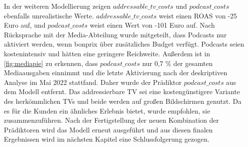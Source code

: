 In der weiteren Modellierung zeigen \(addressable\_tv\_costs\) und \(podcast\_costs\) ebenfalls unrealistische Werte. \(addressable\_tv\_costs\) weist einen \ac{ROAS} von -25 Euro auf, und \(podcast\_costs\) weist einen Wert von -101 Euro auf. Nach Rücksprache mit der Media-Abteilung wurde mitgeteilt, dass Podcasts nur aktiviert werden, wenn bonprix über zusätzliches Budget verfügt. Podcasts seien kostenintensiv und hätten eine geringere Reichweite. Außerdem ist in \autoref{fig:mediapie} zu erkennen, dass \(podcast\_costs\) nur 0,7 \% der gesamten Mediaausgaben einnimmt und die letzte Aktivierung nach der deskriptiven Analyse im Mai 2022 stattfand. Daher wurde der Prädiktor \(podcast\_costs\) aus dem Modell entfernt. Das addressierbare TV sei eine kostengünstigere Variante des herkömmlichen TVs und beide werden auf großen Bildschirmen genutzt. Da es für die Kunden ein ähnliches Erlebnis bietet, wurde empfohlen, sie zusammenzuführen. Nach der Fertigstellung der neuen Kombination der Prädiktoren wird das Modell erneut ausgeführt und aus diesen finalen Ergebnissen wird im nächsten Kapitel eine Schlussfolgerung gezogen. 
\newpage
